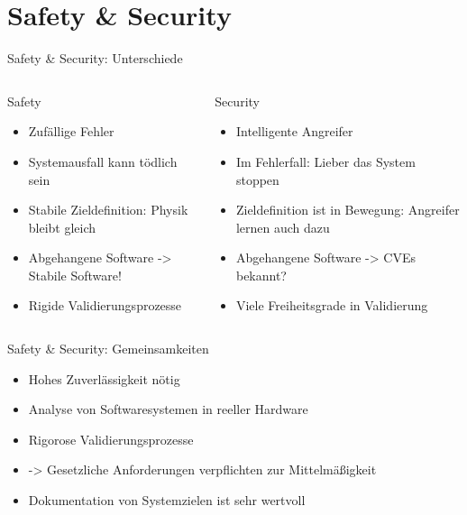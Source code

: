 \section{Safety \& Security}

\begin{frame}[T]{Safety \& Security: Unterschiede}
\small
  \begin{columns}[t,fullwidth]
   \hfill
    \begin{column}{.45\linewidth}
      \begin{block}{Safety}
      \begin{itemize}
        \item Zufällige Fehler
        \item Systemausfall kann tödlich sein
        \item Stabile Zieldefinition: Physik bleibt gleich
        \item Abgehangene Software -> Stabile Software!
        \item Rigide Validierungsprozesse
      \end{itemize}
      \end{block}
    \end{column}
    \hfill
    \begin{column}{.45\linewidth}
      \begin{block}{Security}
      \begin{itemize}
        \item Intelligente Angreifer
        \item Im Fehlerfall: Lieber das System stoppen
        \item Zieldefinition ist in Bewegung: Angreifer lernen auch dazu
        \item Abgehangene Software -> CVEs bekannt?
        \item Viele Freiheitsgrade in Validierung
      \end{itemize}
      \end{block}
    \end{column}
    \hfill
  \end{columns}
\end{frame}


\begin{frame}[T]{Safety \& Security: Gemeinsamkeiten}
  \begin{itemize}
    \item Hohes Zuverlässigkeit nötig
    \item Analyse von Softwaresystemen in reeller Hardware
    \item Rigorose Validierungsprozesse
    \item -> Gesetzliche Anforderungen verpflichten zur Mittelmäßigkeit
    \item Dokumentation von Systemzielen ist sehr wertvoll
  \end{itemize}
\end{frame}


